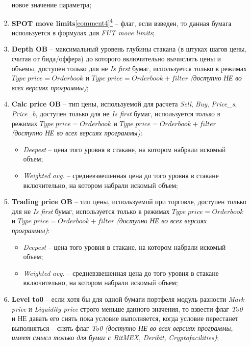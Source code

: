 \begin{enumerate}
		новое значение параметра;
	\item \textbf{SPOT move limits}\hyperref[comment4]{\ref{comment4}\textsuperscript{4}} -- флаг, если взведен, то данная бумага используется в формулах для \textit{FUT move limits};	
	\item \textbf{Depth OB} -- максимальный уровень глубины стакана (в штуках шагов цены, считая от бида/оффера) до которого включительно вычислять цены и объемы, доступен только для не \textit{Is first} бумаг,
		используется только в режимах $Type \; price = Orderbook$ и $Type \; price = Orderbook + filter$ \textit{(доступно НЕ во всех версиях программы)};
	\item \textbf{Calc price OB} -- тип цены, используемой для расчета \textit{Sell}, \textit{Buy}, \textit{Price\_s}, \textit{Price\_b}, доступен только для не \textit{Is first} бумаг,
		используется только в режимах $Type \; price = Orderbook$ и $Type \; price = Orderbook + filter$ \textit{(доступно НЕ во всех версиях программы)}:
		\begin{itemize}
			\item \textit{Deepest} -- цена того уровня в стакане, на котором набрали искомый объем;
			\item \textit{Weighted avg.} -- средневзвешенная цена до того уровня в стакане включительно, на котором набрали искомый объем;
		\end{itemize}
	\item \textbf{Trading price OB} -- тип цены, используемой при торговле, доступен только для не \textit{Is first} бумаг,
		используется только в режимах $Type \; price = Orderbook$ и $Type \; price = Orderbook + filter$ \textit{(доступно НЕ во всех версиях программы)}:
		\begin{itemize}
			\item \textit{Deepest} -- цена того уровня в стакане, на котором набрали искомый объем;
			\item \textit{Weighted avg.} -- средневзвешенная цена до того уровня в стакане включительно, на котором набрали искомый объем;
		\end{itemize}
	\item \textbf{Level to0} -- если хотя бы для одной бумаги портфеля модуль разности \textit{Mark price} и \textit{Liquidity price} строго меньше данного
		значения, то взвести флаг \textit{To0} и НЕ давать его снять пока условие выполняется, когда условие перестанет выполняться -- снять флаг \textit{To0} \textit{(доступно НЕ во всех версиях программы, имеет смысл только для бумаг с BitMEX, Deribit, Cryptofacilities)};

\end{enumerate}
